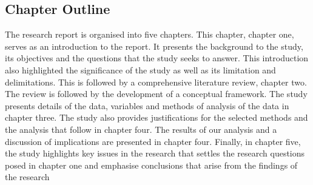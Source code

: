 \documentclass[a4paper, 12pt]{article}
\begin{document}
\begin{enumerate}
	\section{Chapter Outline}
	The  research  report  is  organised  into  five  chapters.  This  chapter,  chapter  one,  serves  as  an introduction  to  the  report.  It  presents  the  background  to  the  study,  its  objectives  and  the questions  that the  study  seeks  to  answer.  This  introduction  also  highlighted  the  significance of the study as well as  its  limitation and delimitations. This  is  followed  by a comprehensive literature  review,  chapter  two.  The  review  is  followed  by  the  development  of  a  conceptual framework.  The  study  presents  details  of  the  data,  variables  and  methods  of  analysis  of  the data in chapter three. The study also provides  justifications  for the  selected  methods and the analysis  that  follow  in  chapter  four.  The  results  of  our  analysis  and  a  discussion  of implications  are  presented  in  chapter  four.  Finally,  in  chapter  five,  the  study  highlights  key issues  in the research that settles the research questions posed  in chapter one and emphasise conclusions that arise from the findings of the research
	
	\end{enumerate}
	\newpage
	\singlespacing
		
	
\end{document}
